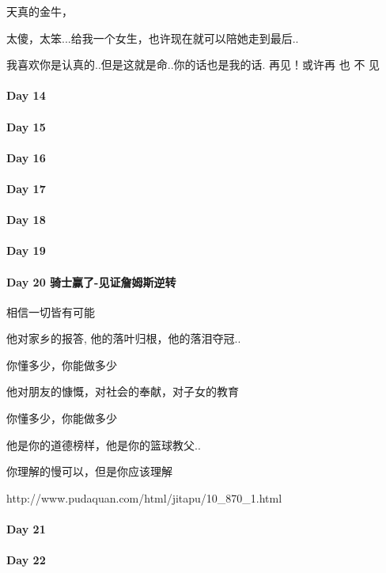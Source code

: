 \documentclass[UTF8,a4paper,8pt]{ctexbook}
\begin{document}
	 	 天真的金牛，
	 	 
	 	 太傻，太笨...给我一个女生，也许现在就可以陪她走到最后..
	 	 
	 	 我喜欢你是认真的..但是这就是命..你的话也是我的话.  再见！或许再 也 不 见
 	 \paragraph{Day 14      \quad     }
 	 \paragraph{Day 15      \quad     }
 	 \paragraph{Day 16      \quad     }
 	 \paragraph{Day 17      \quad     }
 	 \paragraph{Day 18      \quad     }
 	 \paragraph{Day 19      \quad     }
 	 \paragraph{Day 20  骑士赢了-见证詹姆斯逆转    \quad     }
	 	 相信一切皆有可能
	 	 
	 	 
	 	 他对家乡的报答, 他的落叶归根，他的落泪夺冠..
	 	 
	 	 你懂多少，你能做多少
	 	 
	 	 他对朋友的慷慨，对社会的奉献，对子女的教育
	 	 
	 	 你懂多少，你能做多少
	 	 
	 	 他是你的道德榜样，他是你的篮球教父..
	 	 
	 	 你理解的慢可以，但是你应该理解
	 	   
	 	 http://www.pudaquan.com/html/jitapu/10\_870\_1.html
 	 \paragraph{Day 21      \quad     }
 	 \paragraph{Day 22      \quad     }
\end{document}
